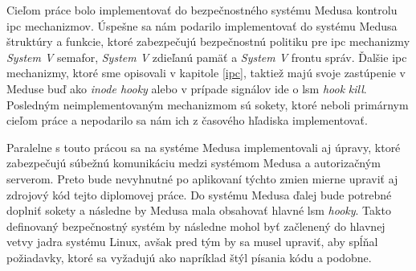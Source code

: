 Cieľom práce bolo implementovať do bezpečnostného systému Medusa kontrolu \acrshort{ipc} mechanizmov. Úspešne sa nám podarilo implementovať do systému Medusa štruktúry a funk\-cie, ktoré zabezpečujú bezpečnostnú politiku pre \acrshort{ipc} mechanizmy \textit{System V} semafor, \textit{System V} zdieľanú pamäť a \textit{System V} frontu správ. Ďalšie \acrshort{ipc} mechanizmy, ktoré sme opisovali v kapitole \ref{ipc}, taktiež majú svoje zastúpenie v Meduse buď ako \textit{inode hooky} alebo v prípade signálov ide o \acrshort{lsm} \textit{hook} \textit{kill}. Posledným neimplementovaným mechanizmom sú sokety, ktoré neboli primárnym cieľom práce a nepodarilo sa nám ich z časového hľadiska implementovať. 

Paralelne s touto prácou sa na systéme Medusa implementovali aj úpravy, ktoré zabezpečujú súbežnú komunikáciu medzi systémom Medusa a autorizačným serverom. Preto bude nevyhnutné po aplikovaní týchto zmien mierne upraviť aj zdrojový kód tejto diplomovej práce. Do systému Medusa ďalej bude potrebné doplniť sokety a následne by Medusa mala obsahovať hlavné \acrshort{lsm} \textit{hooky}. Takto definovaný bezpečnostný systém by následne mohol byť začlenený do hlavnej vetvy jadra systému Linux, avšak pred tým by sa musel upraviť, aby spĺňal požiadavky, ktoré sa vyžadujú ako napríklad štýl písania kódu a podobne.